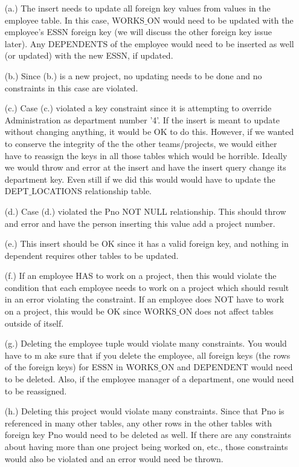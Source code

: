 \documentclass[12pt]{article}
\begin{document}
\begin{enumerate}
	\begin{itemize}
		\item[(a.)] The insert needs to update all foreign key values from values in the employee table. In this case, WORKS$\_$ON would need to be updated with the employee's ESSN foreign key (we will discuss the other foreign key issue later). Any DEPENDENTS of the employee would need to be inserted as well (or updated) with the new ESSN, if updated.
		\item[(b.)] Since (b.) is a new project, no updating needs to be done and no constraints in this case are violated.
		\item[(c.)] Case (c.) violated a key constraint since it is attempting to override Administration as department number '4'. If the insert is meant to update without changing anything, it would be OK to do this. However, if we wanted to conserve the integrity of the the other teams/projects, we would either have to reassign the keys in all those tables which would be horrible. Ideally we would throw and error at the insert and have the insert query change its department key. Even still if we did this would would have to update the DEPT$\_$LOCATIONS relationship table.
		\item[(d.)] Case (d.) violated the Pno NOT NULL relationship. This should throw and error and have the person inserting this value add a project number.
		\item[(e.)] This insert should be OK since it has a valid foreign key, and nothing in dependent requires other tables to be updated.
		\item[(f.)] If an employee HAS to work on a project, then this would violate the condition that each employee needs to work on a project which should result in an error violating the constraint. If an employee does NOT have to work on a project, this would be OK since WORKS$\_$ON does not affect tables outside of itself.
		\item[(g.)] Deleting the employee tuple would violate many constraints. You would have to m ake sure that if you delete the employee, all foreign keys (the rows of the foreign keys) for ESSN in WORKS$\_$ON and DEPENDENT would need to be deleted. Also, if the employee manager of a department, one would need to be reassigned.
		\item[(h.)] Deleting this project would violate many constraints. Since that Pno is referenced in many other tables, any other rows in the other tables with foreign key Pno would need to be deleted as well. If there are any constraints about having more than one project being worked on, etc., those constraints would also be violated and an error would need be thrown.

\end{itemize}
\end{enumerate}
\end{document}
